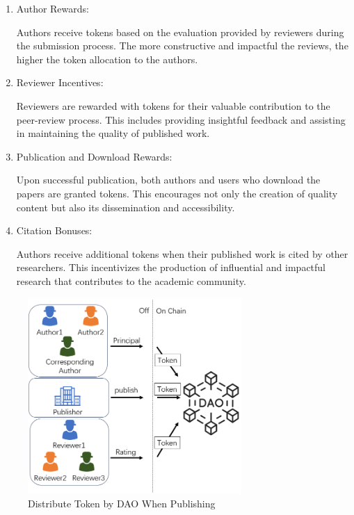 \documentclass[lettersize,journal]{IEEEtran}
\begin{document}
\begin{enumerate}
  \item Author Rewards:

  Authors receive tokens based on the evaluation provided by reviewers during the submission process. The more constructive and impactful the reviews, the higher the token allocation to the authors.

  \item Reviewer Incentives:
  
  Reviewers are rewarded with tokens for their valuable contribution to the peer-review process. This includes providing insightful feedback and assisting in maintaining the quality of published work.
  
  \item Publication and Download Rewards:
  
  Upon successful publication, both authors and users who download the papers are granted tokens. This encourages not only the creation of quality content but also its dissemination and accessibility.

  \item Citation Bonuses:

  Authors receive additional tokens when their published work is cited by other researchers. This incentivizes the production of influential and impactful research that contributes to the academic community.

\end{enumerate}

\begin{figure}[h]
  \centering
  \includegraphics[width=3.2in]{assets/publishtoken.png}
  \caption{Distribute Token by DAO When Publishing}
  \label{fig:publishtoken}
\end{figure}
\end{document}
